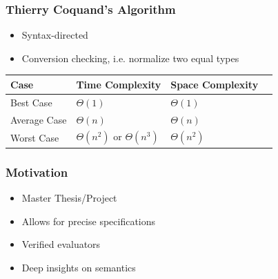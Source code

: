 \documentclass{beamer}
\begin{document}
\begin{frame}
  \frametitle{Thierry Coquand's Algorithm}
  \begin{itemize}
  \item Syntax-directed
  \item Conversion checking, i.e. normalize two equal types
  \end{itemize}
  \centering
\begin{tabularx}{0.8\textwidth}{
  | >{\raggedright\arraybackslash}X
  | >{\centering\arraybackslash}X
  | >{\raggedright\arraybackslash}X
  | >{\raggedright\arraybackslash}X | }
  \hline
  Case & Time Complexity & Space Complexity \\
  \hline
  Best Case & $\Theta(1)$ & $\Theta(1)$ \\
  \hline
  Average Case & $\Theta(n)$ & $\Theta(n)$ \\
  \hline
  Worst Case & $\Theta(n^2)$ or $\Theta(n^3)$ & $\Theta(n^2)$ \\
  \hline
\end{tabularx}  
\end{frame}

\begin{frame}
  \frametitle{Motivation}
  \begin{itemize}
  \item Master Thesis/Project
  \item Allows for precise specifications
  \item Verified evaluators
  \item Deep insights on semantics
  \end{itemize}
\end{frame}

\end{document}
